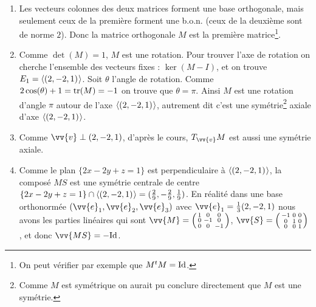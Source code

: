 \documentclass[a4paper,12pt,reqno]{amsart}
\begin{document}
\begin{solution}


  \begin{enumerate}
    \item Les vecteurs colonnes des deux matrices forment une base orthogonale, mais seulement ceux de la première forment une b.o.n. (ceux de la deuxième sont de norme $2$). Donc la matrice orthogonale $M$ est la première matrice\footnote{On peut vérifier par exemple que $M^{t}M=\mathrm{Id}$.}.
    \item Comme $\det(M)=1$, $M$ est une rotation. Pour trouver l'axe de rotation on cherche l'ensemble des vecteurs fixes : $\ker(M-I)$, et on trouve $E_{1}=\langle{(2,-2,1)}\kern.07em\rangle$. Soit $\theta$ l'angle de rotation. Comme $2\cos(\theta)+1=\operatorname{tr}(M)=-1$ on trouve que $\theta=\pi$. Ainsi $M$ est une rotation d'angle $\pi$ autour de l'axe $\langle{(2,-2,1)}\kern.07em\rangle$, autrement dit c'est une symétrie\footnote{Comme $M$ est symétrique on aurait pu conclure directement que $M$ est une symétrie.} axiale d'axe $\langle{(2,-2,1)}\kern.07em\rangle$.
    \item Comme $\vv{v} \perp (2,-2,1)$, d'après le cours, $T_{\vv{v}}M$ est aussi une symétrie axiale.
    \item Comme le plan $\{2x - 2y + z = 1\}$ est perpendiculaire à $\langle{(2,-2,1)}\kern.07em\rangle$, la composé $MS$ est une symétrie centrale de centre $\{2x - 2y + z = 1\} \cap \langle{(2,-2,1)}\kern.07em\rangle = {(\frac{2}{9},-\frac{2}{9},\frac{1}{9})}$. En réalité dans une base orthonormée $(\vv{e}_{1}, \vv{e}_{2}, \vv{e}_{3})$ avec $\vv{e}_{1}=\frac{1}{3}(2,-2,1)$ nous avons les parties linéaires qui sont $\vv{M}=\begin{psmallmatrix}1&0&0\\0&-1&0\\0&0&-1\end{psmallmatrix}$, $\vv{S}=\begin{psmallmatrix}-1&0&0\\0&1&0\\0&0&1\end{psmallmatrix}$, et donc $\vv{MS}=-\id$.
  \end{enumerate}
\end{solution}
\end{document}
